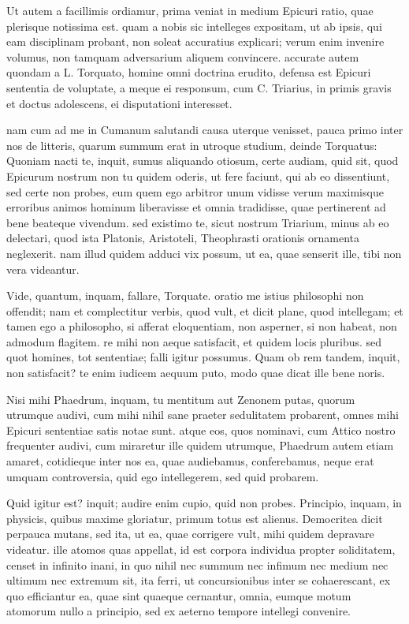  Ut autem a facillimis ordiamur, prima veniat in medium Epicuri ratio, quae plerisque notissima est. quam a nobis sic intelleges expositam, ut ab ipsis, qui eam disciplinam probant, non soleat accuratius explicari; verum enim invenire volumus, non tamquam adversarium aliquem convincere. accurate autem quondam a L. Torquato, homine omni doctrina erudito, defensa est Epicuri sententia de voluptate, a meque ei responsum, cum C. Triarius, in primis gravis et doctus adolescens, ei disputationi interesset.

 nam cum ad me in Cumanum salutandi causa uterque venisset, pauca primo inter nos de litteris, quarum summum erat in utroque studium, deinde Torquatus: Quoniam nacti te, inquit, sumus aliquando otiosum, certe audiam, quid sit, quod Epicurum nostrum non tu quidem oderis, ut fere faciunt, qui ab eo dissentiunt, sed certe non probes, eum quem ego arbitror unum vidisse verum maximisque erroribus animos hominum liberavisse et omnia tradidisse, quae pertinerent ad bene beateque vivendum. sed existimo te, sicut nostrum Triarium, minus ab eo delectari, quod ista Platonis, Aristoteli, Theophrasti orationis ornamenta neglexerit. nam illud quidem adduci vix possum, ut ea, quae senserit ille, tibi non vera videantur.

 Vide, quantum, inquam, fallare, Torquate. oratio me istius philosophi non offendit; nam et complectitur verbis, quod vult, et dicit plane, quod intellegam; et tamen ego a philosopho, si afferat eloquentiam, non asperner, si non habeat, non admodum flagitem. re mihi non aeque satisfacit, et quidem locis pluribus. sed quot homines, tot sententiae; falli igitur possumus. Quam ob rem tandem, inquit, non satisfacit? te enim iudicem aequum puto, modo quae dicat ille bene noris.

 Nisi mihi Phaedrum, inquam, tu mentitum aut Zenonem putas, quorum utrumque audivi, cum mihi nihil sane praeter sedulitatem probarent, omnes mihi Epicuri sententiae satis notae sunt. atque eos, quos nominavi, cum Attico nostro frequenter audivi, cum miraretur ille quidem utrumque, Phaedrum autem etiam amaret, cotidieque inter nos ea, quae audiebamus, conferebamus, neque erat umquam controversia, quid ego intellegerem, sed quid probarem.

 Quid igitur est? inquit; audire enim cupio, quid non probes. Principio, inquam, in physicis, quibus maxime gloriatur, primum totus est alienus. Democritea dicit perpauca mutans, sed ita, ut ea, quae corrigere vult, mihi quidem depravare videatur. ille atomos quas appellat, id est corpora individua propter soliditatem, censet in infinito inani, in quo nihil nec summum nec infimum nec medium nec ultimum nec extremum sit, ita ferri, ut concursionibus inter se cohaerescant, ex quo efficiantur ea, quae sint quaeque cernantur, omnia, eumque motum atomorum nullo a principio, sed ex aeterno tempore intellegi convenire.

